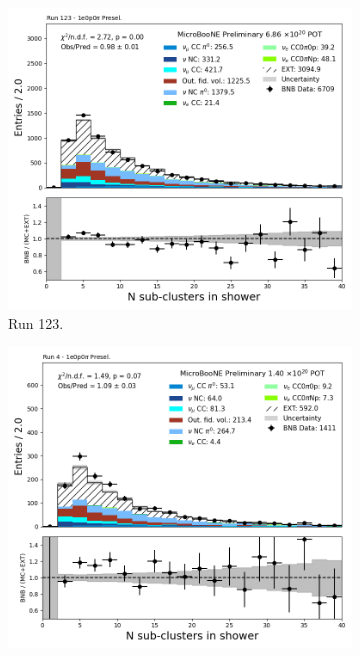 \begin{figure}[H]
    \centering
    \begin{subfigure}[t]{0.32\linewidth}
        \includegraphics[width=\linewidth]{technote/Appendix_Preselection/Figures/1e0p0pi/Run123/subcluster_Run123_1e0p0pi_Presel.png}
        \caption{Run 123.}
    \end{subfigure}%
    \hspace{0.2cm}%
    \begin{subfigure}[t]{0.32\linewidth}
        \includegraphics[width=\linewidth]{technote/Appendix_Preselection/Figures/1e0p0pi/Run4b/subcluster_Run4b_1e0p0pi_Presel.png}

\end{subfigure}
\end{figure}
